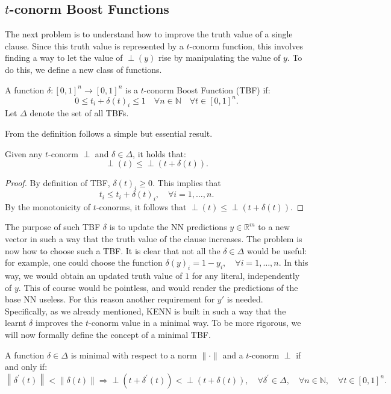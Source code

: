 \subsection{$t$-conorm Boost Functions}
The next problem is to understand how to improve the truth value of a single clause. Since this truth value is represented by a $t$-conorm function, this involves finding a way to let the value of $\perp(y)$ rise by manipulating the value of $y$. To do this, we define a new class of functions.

\begin{definition}
	A function $\delta:[0,1]^{n} \rightarrow[0,1]^{n}$ is a $t$-conorm Boost Function (TBF) if:
	$$
	0 \leq t_{i}+\delta(t)_{i} \leq 1  \quad \forall n \in \mathbb{N} \quad \forall t \in[0,1]^{n}.
	$$
	Let $\Delta$ denote the set of all TBFs.
\end{definition}
From the definition follows a simple but essential result.

\begin{lemma}
	Given any $t$-conorm $\perp$ and $\delta \in \Delta$, it holds that:
	$$ \perp(t) \leq \perp(t + \delta(t)).$$
\end{lemma}
\begin{proof}
	By definition of TBF, $\delta(t)_i \geq 0$. This implies that $$t_i \leq t_i + \delta(t)_i, \quad \forall i=1,\dots,n.$$By the monotonicity of $t$-conorms, it follows that $\perp(t) \leq \perp(t+\delta(t))$.
\end{proof}

The purpose of such TBF $\delta$ is to update the NN predictions $y \in \mathbb{R}^m$ to a new vector %
in such a way that the truth value of the clause increases. The problem is now how to choose such a TBF. It is clear that not all the $\delta \in \Delta$ would be useful: for example, one could choose the function $\delta(y)_i = 1-y_i, \quad \forall i=1,\dots,n$. In this way, we would obtain an updated truth value of $1$ for any literal, independently of $y$. This of course would be pointless, and would render the predictions of the base NN useless. For this reason another requirement for $y'$ is needed. Specifically, as we already mentioned, KENN is built in such a way that the learnt $\delta$ improves the $t$-conorm value in a minimal way. To be more rigorous, we will now formally define the concept of a minimal TBF.

\begin{definition}
	A function $\delta \in \Delta$ is minimal with respect to a norm $\|\cdot\|$ and a $t$-conorm $\perp$ if and only if:
	$$
	\left\|\delta^{\prime}(t)\right\|<\|\delta(t)\| \Rightarrow \perp\left(t+\delta^{\prime}(t)\right)<\perp(t+\delta(t)), \quad \forall \delta^{\prime} \in \Delta, \quad \forall n \in \mathbb{N}, \quad \forall t \in[0,1]^{n}.
	$$
\end{definition}

